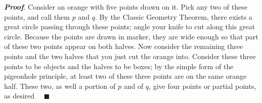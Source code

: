 \documentclass{report}
\begin{document}
\begin{itemize}
            \bigbreak \noindent 
            \textbf{\textit{Proof}}. Consider an orange with five points drawn on it. Pick any two of these points, and call them $p$ and $q$. By the Classic Geometry Theorem, there exists a great circle passing through these points; angle your knife to cut along this great circle. Because the points are drawn in marker, they are wide enough so that part of these two points appear on both halves.
            \bigbreak \noindent 
            Now consider the remaining three points and the two halves that you just cut the orange into. Consider these three points to be objects and the halves to be boxes; by the simple form of the pigeonhole principle, at least two of these three points are on the same orange half. These two, as well a portion of $p$ and of $q$, give four points or partial points, as desired $\quad \blacksquare $



    \end{itemize}

    \pagebreak 
\end{document}
